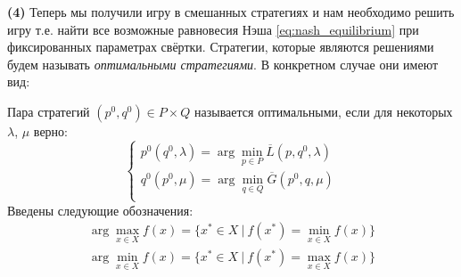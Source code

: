 \hspace{3mm}

\textbf{(4)}
Теперь мы получили игру в смешанных стратегиях и нам необходимо решить игру
т.е. найти все возможные равновесия Нэша \eqref{eq:nash_equilibrium}
при фиксированных параметрах свёртки. 
Стратегии, которые являются решениями будем называть 
\textit{оптимальными стратегиями}. В конкретном случае они имеют вид:

\begin{Def}	
	Пара стратегий $(p^0, q^0) \in P \times Q$
	называется оптимальными, если для некоторых 
	$\lambda$, $\mu$ верно:
	\begin{equation}
		\begin{cases} 
			p^0(q^0, \lambda) = 
			\arg \min \limits_{p \in P} \overline L(p, q^0, \lambda) \\ 
			q^0(p^0, \mu) = 
			\arg \min \limits_{q \in Q} \overline G(p^0, q, \mu) \\
		\end{cases}
	\label{def:optimal_strategy}
	\end{equation}
	Введены следующие обозначения:
	\begin{gather*}
		\arg \max \limits_{x \in X} f(x) = 
		\{ x^* \in X \: | \: f(x^*) = \min \limits_{x \in X} f(x)\}
		\\
		\arg \min \limits_{x \in X} f(x) = 
		\{ x^* \in X \: | \: f(x^*) = \max \limits_{x \in X} f(x)\}
	\end{gather*}
\end{Def}





